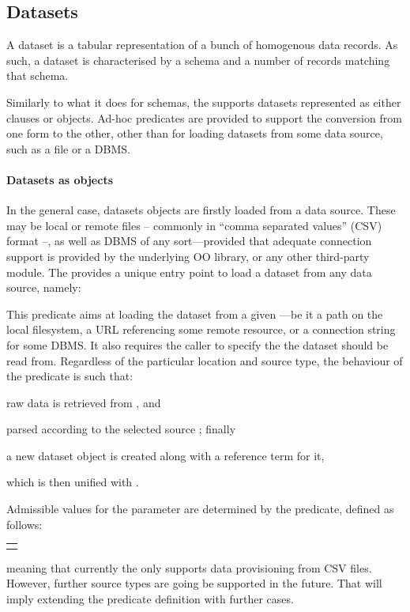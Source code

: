 \documentclass[12pt,a4paper,openright,twoside]{book}
\begin{document}
\subsection{Datasets}

A dataset is a tabular representation of a bunch of homogenous data records.
%
As such, a dataset is characterised by a schema and a number of records matching that schema.

Similarly to what it does for schemas, the \mllib{} supports datasets represented as either clauses or objects.
%
Ad-hoc predicates are provided to support the conversion from one form to the other, other than for loading datasets from some data source, such as a file or a DBMS.

\paragraph{Datasets as objects}

In the general case, datasets objects are firstly loaded from a data source.
%
These may be local or remote files -- commonly in ``comma separated values'' (CSV) format --, as well as DBMS of any sort---provided that adequate connection support is provided by the underlying OO library, or any other third-party module.
%
The \mllib{} provides a unique entry point to load a dataset from any data source, namely:
%
\begin{center}
\end{center}
%
This predicate aims at loading the dataset from a given ---be it a path on the local filesystem, a URL referencing some remote resource, or a connection string for some DBMS.
%
It also requires the caller to specify the  the dataset should be read from.
%
Regardless of the particular location and source type, the behaviour of the  predicate is such that:
%
\begin{inlinelist}
    \item raw data is retrieved from , and
    \item parsed according to the selected source ; finally
    \item a new dataset object is created along with a reference term for it,
    \item which is then unified with .
\end{inlinelist}

Admissible values for the  parameter are determined by the  predicate, defined as follows:
%
\begin{center}
    \begin{tabular}{l}
        \pl{source\_type(\pli{csv}).}
    \end{tabular}
\end{center}
%
meaning that currently the \mllib{} only supports data provisioning from CSV files.
%
However, further source types are going be supported in the future.
%
That will imply extending the  predicate definition with further cases.
\end{document}
